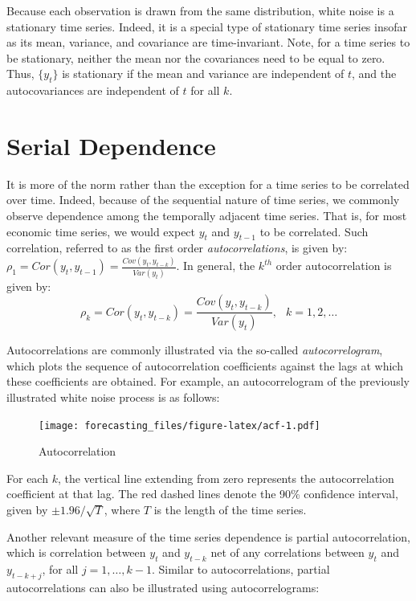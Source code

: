 \documentclass[
  12pt,
  oneside]{book}
\begin{document}
Because each observation is drawn from the same distribution, white noise is a stationary time series. Indeed, it is a special type of stationary time series insofar as its mean, variance, and covariance are time-invariant. Note, for a time series to be stationary, neither the mean nor the covariances need to be equal to zero. Thus, \(\{y_t\}\) is stationary if the mean and variance are independent of \(t\), and the autocovariances are independent of \(t\) for all \(k\).

\hypertarget{serial-dependence}{%
\section{Serial Dependence}\label{serial-dependence}}

It is more of the norm rather than the exception for a time series to be correlated over time. Indeed, because of the sequential nature of time series, we commonly observe dependence among the temporally adjacent time series. That is, for most economic time series, we would expect \(y_t\) and \(y_{t-1}\) to be correlated. Such correlation, referred to as the first order \emph{autocorrelations}, is given by: \(\rho_1=Cor(y_{t},y_{t-1}) = \frac{Cov(y_{t},y_{t-k})}{Var(y_t)}\). In general, the \(k^{th}\) order autocorrelation is given by: \[\rho_k=Cor(y_{t},y_{t-k}) = \frac{Cov(y_{t},y_{t-k})}{Var(y_{t})},\;~~k=1,2,\ldots\]

Autocorrelations are commonly illustrated via the so-called \emph{autocorrelogram}, which plots the sequence of autocorrelation coefficients against the lags at which these coefficients are obtained. For example, an autocorrelogram of the previously illustrated white noise process is as follows:

\begin{figure}
\centering
\texttt{[image: forecasting\_files/figure-latex/acf-1.pdf]}
\caption{\label{fig:acf}Autocorrelation}
\end{figure}

For each \(k\), the vertical line extending from zero represents the autocorrelation coefficient at that lag. The red dashed lines denote the 90\% confidence interval, given by \(\pm 1.96/\sqrt{T}\), where \(T\) is the length of the time series.

Another relevant measure of the time series dependence is partial autocorrelation, which is correlation between \(y_t\) and \(y_{t-k}\) net of any correlations between \(y_t\) and \(y_{t-k+j}\), for all \(j=1,\ldots,k-1\). Similar to autocorrelations, partial autocorrelations can also be illustrated using autocorrelograms:
\end{document}
